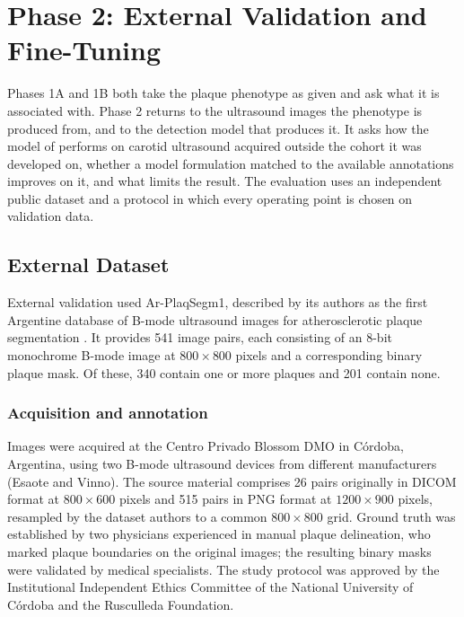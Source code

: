 \section{Phase 2: External Validation and Fine-Tuning}
\label{sec:phase2}

Phases 1A and 1B both take the plaque phenotype as given and ask what it is associated with.
Phase 2 returns to the ultrasound images the phenotype is produced from, and to the detection
model that produces it. It asks how the model of \textcite{omarov2024deep} performs on carotid
ultrasound acquired outside the cohort it was developed on, whether a model formulation matched
to the available annotations improves on it, and what limits the result. The evaluation uses an independent public dataset and a protocol in
which every operating point is chosen on validation data.

\subsection{External Dataset}
\label{subsec:external-dataset}
External validation used Ar-PlaqSegm1, described by its authors as the first Argentine database
of B-mode ultrasound images for atherosclerotic plaque segmentation
\cite{rulloni2025arplaqsegm1}. It provides 541 image pairs, each consisting of an 8-bit
monochrome B-mode image at $800 \times 800$ pixels and a corresponding binary plaque mask. Of
these, 340 contain one or more plaques and 201 contain none.

\subsubsection*{Acquisition and annotation}
Images were acquired at the Centro Privado Blossom DMO in C\'ordoba, Argentina, using two B-mode
ultrasound devices from different manufacturers (Esaote and Vinno). The source material comprises
26 pairs originally in DICOM format at $800 \times 600$ pixels and 515 pairs in PNG format at
$1200 \times 900$ pixels, resampled by the dataset authors to a common $800 \times 800$ grid.
Ground truth was established by two physicians experienced in manual plaque delineation, who
marked plaque boundaries on the original images; the resulting binary masks were validated by
medical specialists. The study protocol was approved by the Institutional Independent Ethics
Committee of the National University of C\'ordoba and the Rusculleda Foundation.

